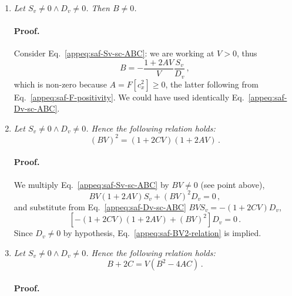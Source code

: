 \begin{tabproof}
\begin{enumerate}
	Let $S_v = 0$. From Eq.~\eqref{appeq:saf-Dv-sc-ABC}, using $C = F\left[c_y^2 \right] \ge 0$ implied by Eq.~\eqref{appeq:saf-F-positivity}:
	\[
		\underbrace{(1+2CV)}_{>0} D_v = 0
		\quad\implies\quad
		D_v = 0 \, .
	\]
	Identically, let $D_v = 0$. Then applying the same consideration on Eq.~\eqref{appeq:saf-Sv-sc-ABC} with $C \leftrightarrow A$, we conclude $S_v = 0$. Either both are non-zero or both are zero.
	\item \textit{Let $S_v \neq 0 \land D_v \neq 0$. Then $B \neq 0$.} 
	
	\paragraph{Proof.}
	
	Consider Eq.~\eqref{appeq:saf-Sv-sc-ABC}: we are working at $V>0$, thus
	\[
		B = - \frac{1 + 2AV}{V} \frac{S_v}{D_v} \, ,
	\]
	which is non-zero because $A = F\left[c_x^2 \right] \ge 0$, the latter following from Eq.~\eqref{appeq:saf-F-positivity}. We could have used identically Eq.~\eqref{appeq:saf-Dv-sc-ABC}.
	\item \textit{Let $S_v \neq 0 \land D_v \neq 0$. Hence the following relation holds:}
	\begin{equation}\label{appeq:saf-BV2-relation}
		(BV)^2 = (1+2CV)(1+2AV) \, .
	\end{equation}
	
	\paragraph{Proof.}
	
	We multiply Eq.~\eqref{appeq:saf-Sv-sc-ABC} by $BV \neq 0$ (see point above),
	\[
		BV (1+2AV) S_v + (BV)^2 D_v = 0 \, ,
	\]
	and substitute from Eq.~\eqref{appeq:saf-Dv-sc-ABC} $BV S_v = - (1+2CV) D_v$,
	\[
		\left[- (1+2CV) (1+2AV) + (BV)^2\right] D_v = 0 \, .
	\]
	Since $D_v \neq 0$ by hypothesis, Eq.~\eqref{appeq:saf-BV2-relation} is implied.
	\item \textit{Let $S_v \neq 0 \land D_v \neq 0$. Hence the following relation holds:}
	\begin{equation}\label{appeq:saf-B2-4AC-relation}
		B+2C = V(B^2 - 4AC) \, .
	\end{equation}
	
	\paragraph{Proof.}
	

\end{enumerate}
\end{tabproof}
